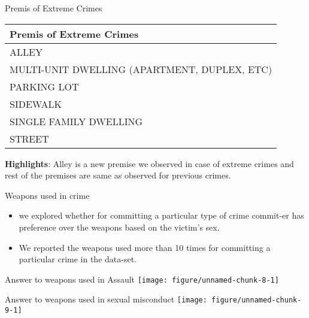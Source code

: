 \documentclass{beamer}\usepackage[]{graphicx}\usepackage[]{xcolor}
\makeatletter
\def\maxwidth{ %
  \ifdim\Gin@nat@width>\linewidth
    \linewidth
  \else
    \Gin@nat@width
  \fi
}
\newenvironment{knitrout}{}{} %
\makeatother
\begin{document}
\begin{frame}[fragile]{Premis of Extreme Crimes}

\begin{knitrout}
\color{fgcolor}
\begin{tabular}{l}
\hline
Premis of Extreme Crimes\\
\hline
ALLEY\\
\hline
MULTI-UNIT DWELLING (APARTMENT, DUPLEX, ETC)\\
\hline
PARKING LOT\\
\hline
SIDEWALK\\
\hline
SINGLE FAMILY DWELLING\\
\hline
STREET\\
\hline
\end{tabular}

\end{knitrout}
\vspace{0.5cm}
\textbf{Highlights}: Alley is a new premise we observed in case of extreme crimes and rest of the premises are same as observed for previous crimes. 
\end{frame}


\begin{frame}[fragile]{Weapons used in crime}


\begin{itemize}
\item we explored whether for committing a particular type of crime commit-er has preference over the weapons based on the victim's sex.

\item We reported the weapons used more than 10 times for committing a particular crime in the data-set.
\end{itemize}


\end{frame}

\begin{frame}[fragile]{Answer to weapons used in Assault}
\begin{knitrout}
\color{fgcolor}
\texttt{[image: figure/unnamed-chunk-8-1]} 
\end{knitrout}



\end{frame}


\begin{frame}[fragile]{Answer to weapons used in sexual misconduct}
\begin{knitrout}
\color{fgcolor}
\texttt{[image: figure/unnamed-chunk-9-1]} 
\end{knitrout}
\end{frame}
\end{document}
